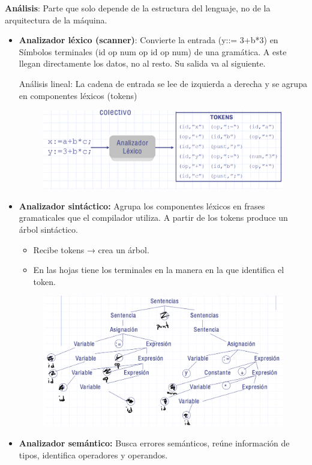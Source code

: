 \documentclass[12pt, twoside, openright]{report} %
\begin{document}
\textbf{Análisis}: Parte que solo depende de la estructura del lenguaje, no de la arquitectura de la máquina.
\begin{itemize}
  \item \textbf{Analizador léxico (scanner)}: Convierte la entrada (y::= 3+b*3) en Símbolos terminales (id op num op id op num) de una gramática. A este llegan directamente los datos, no al resto. Su salida va al siguiente.

    Análisis lineal: La cadena de entrada se lee de izquierda a derecha y se agrupa en componentes léxicos (tokens)
    
    \begin{figure}[H]
      {\includegraphics[scale=.25]{Untitled 12.png}}
    \end{figure}
    
  \item \textbf{Analizador sintáctico:} Agrupa los componentes léxicos en frases
    gramaticales que el compilador utiliza. A partir de los tokens produce
    un árbol sintáctico.
    
    \begin{itemize}
    \item
      Recibe tokens → crea un árbol.
    \item
      En las hojas tiene los terminales en la manera en la que identifica el
      token.
    \end{itemize}
    
    \begin{figure}[H]
      {\includegraphics[scale=.25]{Untitled 13.png}}
    \end{figure}
  \pagebreak
  \item \textbf{Analizador semántico:} Busca errores semánticos, reúne información de tipos, identifica operadores y operandos.
  

\end{itemize}
\end{document}

